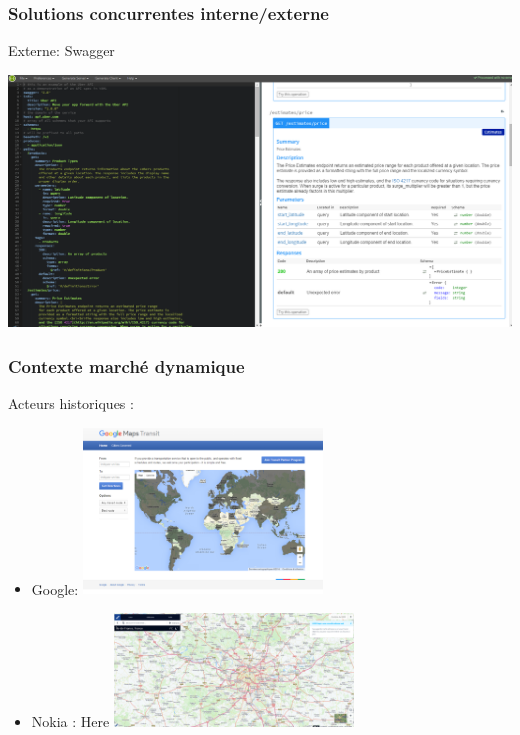 \documentclass[table]{beamer}
\begin{document}
\begin{frame}
  \frametitle{Solutions concurrentes interne/externe}
  \begin{description}
    \item[Externe: Swagger]
  \end{description}
  \centering\includegraphics[width=\linewidth]{images/swagger}
\end{frame}

\begin{frame}
  \frametitle{Contexte marché dynamique}
  \begin{description}
    \item[Acteurs historiques : ]
  \end{description}
  \begin{itemize}
    \item Google: 
    \centering\includegraphics[width=0.5\textwidth]{images/google_transit}
    \item Nokia : Here 
    \centering\includegraphics[width=0.5\textwidth]{images/nokia_here}
  \end{itemize}
\end{frame}
\end{document}

